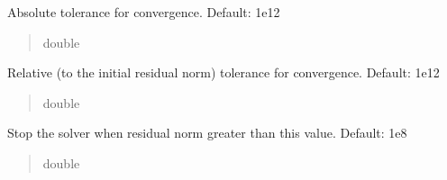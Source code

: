 \documentclass[letterpaper,10pt,english]{sphinxmanual}
\begin{document}
\begin{fulllineitems}

\begin{fulllineitems}
\label{\detokenize{_autosummary/nirfasterff.utils.SolverOptions:nirfasterff.utils.SolverOptions.AbsoluteTolerance}}
\pysigstartsignatures
\pysigline
{}
\pysigstopsignatures
\sphinxAtStartPar
Absolute tolerance for convergence. Default: 1e\sphinxhyphen{}12
\begin{quote}\begin{description}
\sphinxAtStartPar
double

\end{description}\end{quote}

\end{fulllineitems}


\begin{fulllineitems}
\label{\detokenize{_autosummary/nirfasterff.utils.SolverOptions:nirfasterff.utils.SolverOptions.RelativeTolerance}}
\pysigstartsignatures
\pysigline
{}
\pysigstopsignatures
\sphinxAtStartPar
Relative (to the initial residual norm) tolerance for convergence. Default: 1e\sphinxhyphen{}12
\begin{quote}\begin{description}
\sphinxAtStartPar
double

\end{description}\end{quote}

\end{fulllineitems}


\begin{fulllineitems}
\label{\detokenize{_autosummary/nirfasterff.utils.SolverOptions:nirfasterff.utils.SolverOptions.divergence}}
\pysigstartsignatures
\pysigline
{}
\pysigstopsignatures
\sphinxAtStartPar
Stop the solver when residual norm greater than this value. Default: 1e8
\begin{quote}\begin{description}
\sphinxAtStartPar
double


\end{description}
\end{quote}
\end{fulllineitems}
\end{fulllineitems}
\end{document}
